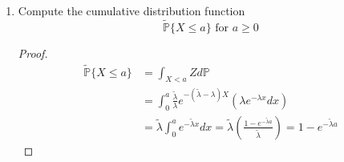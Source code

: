 \documentclass{article}
\newcommand{\p}{\mathbb{P}}
\newcommand{\seq}[1]{\{ #1 \}}
\theoremstyle{definition}
\theoremstyle{definition}
\begin{document}
\begin{enumerate}
\begin{enumerate}
    \begin{proof}
    Since we know the cumulative distribution function, $\p\{X\leq a\} = 1-e^{-\lambda a}, a\geq 0$, it follows that $d\p = \lambda e^{-\lambda x}dx$. Then:
    \begin{align*}
        \tilde{\p}(\Omega) &= \int_{0}^{\infty} \frac{\tilde{\lambda}}{\lambda}e^{-(\tilde{\lambda}-\lambda)X}d\p \\
        &= \frac{\tilde{\lambda}}{\lambda} \int_0^\infty e^{-(\tilde{\lambda}-\lambda)x} \lambda e^{-\lambda x}dx \\
        &= \tilde{\lambda} \int_0^\infty e^{-\tilde{\lambda}x} dx = \frac{\lambda}{\lambda} = 1
    \end{align*}
    \end{proof}
    
    \item Compute the cumulative distribution function 
    $$ \tilde{\p} \seq{X \leq a} \text{ for } a\geq 0$$
    
    \begin{proof}
        \begin{align*}
            \tilde{\p} \seq{X \leq a}  &= \int_{X<a} Z d\p \\
     &=\int_{0}^a \frac{\tilde{\lambda}}{\lambda}e^{-(\tilde{\lambda}-\lambda)X}( \lambda e^{-\lambda x}dx) \\
     & = \tilde{\lambda} \int_0^a e^{-\tilde{\lambda}x}dx = \tilde{\lambda} \left( \frac{1-e^{-\tilde{\lambda}a}}{\tilde{\lambda}}\right) =1-e^{-\tilde{\lambda}a}
        \end{align*}
    \end{proof}
    
    
\end{enumerate}


\end{enumerate}
\end{document}
